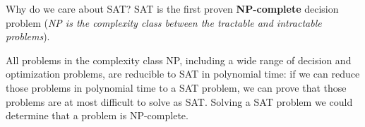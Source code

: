 Why do we care about SAT? SAT is the first proven \textbf{NP-complete} decision problem (\textit{NP is the complexity class between the tractable and 
intractable problems}). \vspace{7pt}

All problems in the complexity class NP, including a wide range of decision and optimization problems, are reducible to SAT in polynomial time: if we can 
reduce those problems in polynomial time to a SAT problem, we can prove that those problems are at most difficult to solve as SAT. Solving a SAT problem 
we could determine that a problem is NP-complete. 